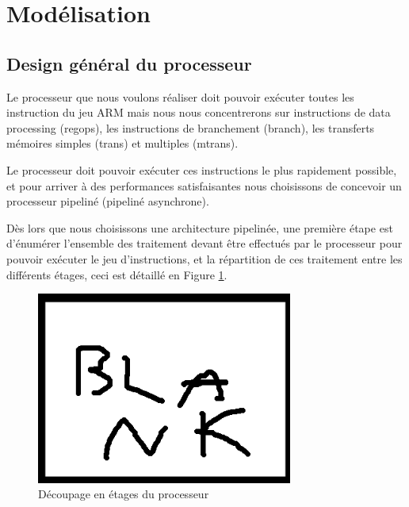 \documentclass{article}
\begin{document}
\section{Modélisation}

\subsection{Design général du processeur}

Le processeur que nous voulons réaliser doit pouvoir exécuter toutes les instruction du jeu ARM
mais nous nous concentrerons sur instructions de data processing (regops),
les instructions de branchement (branch), les transferts mémoires simples (trans) et multiples (mtrans).

Le processeur doit pouvoir exécuter ces instructions le plus rapidement possible, et pour arriver à des
performances satisfaisantes nous choisissons de concevoir un processeur pipeliné (pipeliné asynchrone).

Dès lors que nous choisissons une architecture pipelinée, une première étape est d'énumérer l'ensemble
des traitement devant être effectués par le processeur pour pouvoir exécuter le jeu d'instructions,
et la répartition de ces traitement entre les différents étages, ceci est détaillé en Figure \ref{etages}.

\begin{figure}[H]
\includegraphics[width=0.75\textwidth]{pics/blank.png}
\centering
\caption{Découpage en étages du processeur}
\label{etages}
\end{figure}
\end{document}
